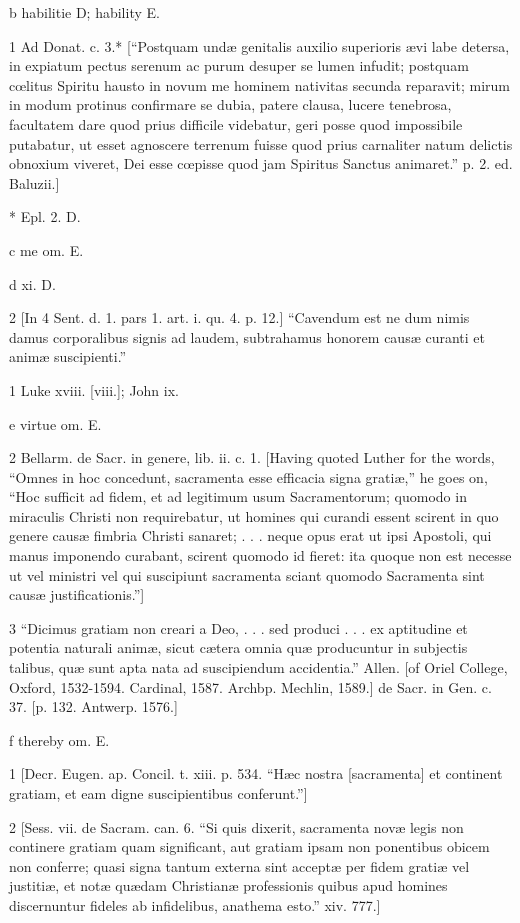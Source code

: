 b
habilitie D; hability E.

1
Ad Donat. c. 3.* [“Postquam undæ genitalis auxilio superioris ævi labe detersa, in expiatum pectus serenum ac purum desuper se lumen infudit; postquam cœlitus Spiritu hausto in novum me hominem nativitas secunda reparavit; mirum in modum protinus confirmare se dubia, patere clausa, lucere tenebrosa, facultatem dare quod prius difficile videbatur, geri posse quod impossibile putabatur, ut esset agnoscere terrenum fuisse quod prius carnaliter natum delictis obnoxium viveret, Dei esse cœpisse quod jam Spiritus Sanctus animaret.” p. 2. ed. Baluzii.]

*
Epl. 2. D.

c
me om. E.

d
xi. D.

2
[In 4 Sent. d. 1. pars 1. art. i. qu. 4. p. 12.] “Cavendum est ne dum nimis damus corporalibus signis ad laudem, subtrahamus honorem causæ curanti et animæ suscipienti.”

1
Luke xviii. [viii.]; John ix.

e
virtue om. E.

2
Bellarm. de Sacr. in genere, lib. ii. c. 1. [Having quoted Luther for the words, “Omnes in hoc concedunt, sacramenta esse efficacia signa gratiæ,” he goes on, “Hoc sufficit ad fidem, et ad legitimum usum Sacramentorum; quomodo in miraculis Christi non requirebatur, ut homines qui curandi essent scirent in quo genere causæ fimbria Christi sanaret; . . . neque opus erat ut ipsi Apostoli, qui manus imponendo curabant, scirent quomodo id fieret: ita quoque non est necesse ut vel ministri vel qui suscipiunt sacramenta sciant quomodo Sacramenta sint causæ justificationis.”]

3
“Dicimus gratiam non creari a Deo, . . . sed produci . . . ex aptitudine et potentia naturali animæ, sicut cætera omnia quæ producuntur in subjectis talibus, quæ sunt apta nata ad suscipiendum accidentia.” Allen. [of Oriel College, Oxford, 1532-1594. Cardinal, 1587. Archbp. Mechlin, 1589.] de Sacr. in Gen. c. 37. [p. 132. Antwerp. 1576.]

f
thereby om. E.

1
[Decr. Eugen. ap. Concil. t. xiii. p. 534. “Hæc nostra [sacramenta] et continent gratiam, et eam digne suscipientibus conferunt.”]

2
[Sess. vii. de Sacram. can. 6. “Si quis dixerit, sacramenta novæ legis non continere gratiam quam significant, aut gratiam ipsam non ponentibus obicem non conferre; quasi signa tantum externa sint acceptæ per fidem gratiæ vel justitiæ, et notæ quædam Christianæ professionis quibus apud homines discernuntur fideles ab infidelibus, anathema esto.” xiv. 777.]

